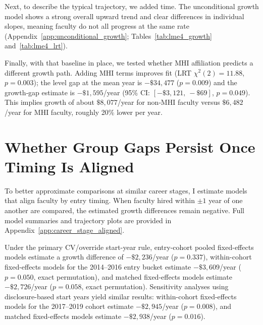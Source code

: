 \documentclass{article}
\begin{document}
Next, to describe the typical trajectory, we added time. The unconditional growth model shows a strong overall upward trend and clear differences in individual slopes, meaning faculty do not all progress at the same rate (Appendix~\ref{app:unconditional_growth}; Tables~\ref{tab:lme4_growth} and~\ref{tab:lme4_lrt}).

Finally, with that baseline in place, we tested whether MHI affiliation predicts a different growth path. Adding MHI terms improves fit (LRT \(\chi^2(2) = 11.88\), \(p = 0.003\)); the level gap at the mean year is \(-\$34{,}477\) (\(p = 0.009\)) and the growth‑gap estimate is \(-\$1{,}595\)/year (95\% CI: \([-\$3{,}121,\ -\$69]\), \(p = 0.049\)). This implies growth of about \(\$8{,}077\)/year for non‑MHI faculty versus \(\$6{,}482\)/year for MHI faculty, roughly 20\% lower per year.




\section*{Whether Group Gaps Persist Once Timing Is Aligned}

To better approximate comparisons at similar career stages, I estimate models that align faculty by entry timing. When faculty hired within \(\pm 1\) year of one another are compared, the estimated growth differences remain negative. Full model summaries and trajectory plots are provided in Appendix~\ref{app:career_stage_aligned}.

Under the primary CV/override start-year rule, entry-cohort pooled fixed-effects models estimate a growth difference of \(-\$2{,}236\)/year (\(p=0.337\)), within-cohort fixed-effects models for the 2014--2016 entry bucket estimate \(-\$3{,}609\)/year (\(p=0.050\), exact permutation), and matched fixed-effects models estimate \(-\$2{,}726\)/year (\(p=0.058\), exact permutation). Sensitivity analyses using disclosure-based start years yield similar results: within-cohort fixed-effects models for the 2017--2019 cohort estimate \(-\$2{,}945\)/year (\(p=0.008\)), and matched fixed-effects models estimate \(-\$2{,}938\)/year (\(p=0.016\)).
\end{document}
